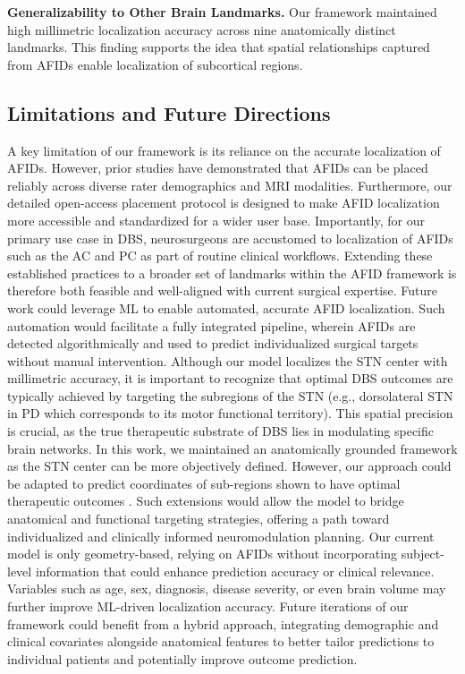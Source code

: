 \textbf{Generalizability to Other Brain Landmarks.} Our framework maintained high millimetric localization accuracy across nine anatomically distinct landmarks. This finding supports the idea that spatial relationships captured from AFIDs enable localization of subcortical regions.

\subsection{Limitations and Future Directions}
A key limitation of our framework is its reliance on the accurate localization of AFIDs. However, prior studies have demonstrated that AFIDs can be placed reliably across diverse rater demographics and MRI modalities. Furthermore, our detailed open-access placement protocol is designed to make AFID localization more accessible and standardized for a wider user base. Importantly, for our primary use case in DBS, neurosurgeons are accustomed to localization of AFIDs such as the AC and PC as part of routine clinical workflows. Extending these established practices to a broader set of landmarks within the AFID framework is therefore both feasible and well-aligned with current surgical expertise. Future work could leverage ML to enable automated, accurate AFID localization. Such automation would facilitate a fully integrated pipeline, wherein AFIDs are detected algorithmically and used to predict individualized surgical targets without manual intervention.
Although our model localizes the STN center with millimetric accuracy, it is important to recognize that optimal DBS outcomes are typically achieved by targeting the subregions of the STN (e.g., dorsolateral STN in PD which corresponds to its motor functional territory). This spatial precision is crucial, as the true therapeutic substrate of DBS lies in modulating specific brain networks. In this work, we maintained an anatomically grounded framework as the STN center can be more objectively defined. However, our approach could be adapted to predict coordinates of sub-regions shown to have optimal therapeutic outcomes \cite{Hollunder2024-wc}. Such extensions would allow the model to bridge anatomical and functional targeting strategies, offering a path toward individualized and clinically informed neuromodulation planning.
Our current model is only geometry-based, relying on AFIDs without incorporating subject-level information that could enhance prediction accuracy or clinical relevance. Variables such as age, sex, diagnosis, disease severity, or even brain volume may further improve ML-driven localization accuracy. Future iterations of our framework could benefit from a hybrid approach, integrating demographic and clinical covariates alongside anatomical features to better tailor predictions to individual patients and potentially improve outcome prediction.
